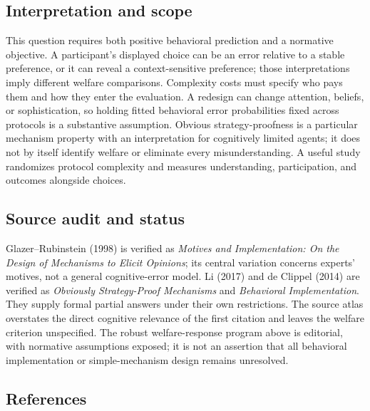 \documentclass[11pt,a4paper]{article}
\begin{document}
\subsection*{Interpretation and scope}

This question requires both positive behavioral prediction and a normative objective. A participant's displayed choice can be an error relative to a stable preference, or it can reveal a context-sensitive preference; those interpretations imply different welfare comparisons. Complexity costs must specify who pays them and how they enter the evaluation. A redesign can change attention, beliefs, or sophistication, so holding fitted behavioral error probabilities fixed across protocols is a substantive assumption. Obvious strategy-proofness is a particular mechanism property with an interpretation for cognitively limited agents; it does not by itself identify welfare or eliminate every misunderstanding. A useful study randomizes protocol complexity and measures understanding, participation, and outcomes alongside choices.

\subsection*{Source audit and status}

Glazer--Rubinstein (1998) is verified as \emph{Motives and Implementation: On the Design of Mechanisms to Elicit Opinions}; its central variation concerns experts' motives, not a general cognitive-error model. Li (2017) and de Clippel (2014) are verified as \emph{Obviously Strategy-Proof Mechanisms} and \emph{Behavioral Implementation}. They supply formal partial answers under their own restrictions. The source atlas overstates the direct cognitive relevance of the first citation and leaves the welfare criterion unspecified. The robust welfare-response program above is editorial, with normative assumptions exposed; it is not an assertion that all behavioral implementation or simple-mechanism design remains unresolved.

\subsection*{References}
\end{document}
